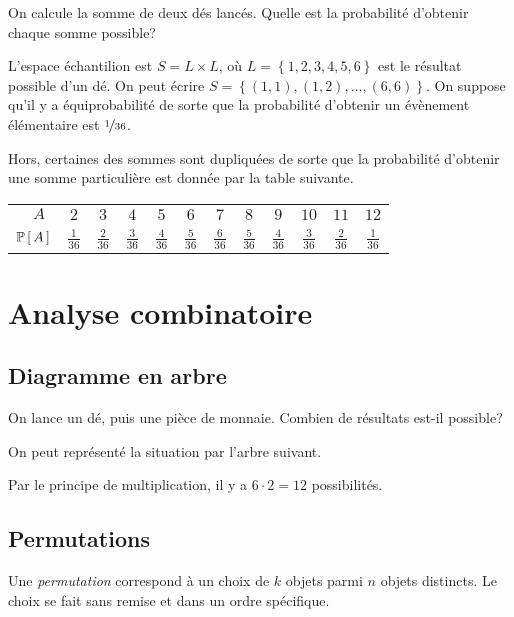 \documentclass[11pt]{article}
\renewcommand\P[1]{%
	\ensuremath{%
		\mathbb{P}\left[\,#1\,\right]%
	}%
}%
\begin{document}
\begin{exemple}
	On calcule la somme de deux dés lancés. Quelle est la probabilité d'obtenir
	chaque somme possible?
	
	L'espace échantilion est $S=L\times L$, où $L=\left\{1,2,3,4,5,6\right\}$
	est le résultat possible d'un dé. On peut écrire
	$S=\left\{(1,1),(1,2),\dots,(6,6)\right\}$. On suppose qu'il y a
	équiprobabilité de sorte que la probabilité d'obtenir un évènement
	élémentaire est $\nicefrac{1}{36}$.

	Hors, certaines des sommes sont dupliquées de sorte que la probabilité
	d'obtenir une somme particulière est donnée par la table suivante.
	\begin{table}[H]
		\centering
		\begin{tabular}{r|ccccccccccc}
			$\phantom{\mathbb{P}(}A\phantom{)}$ &
			$2$ & $3$ & $4$ & $5$ & $6$ & $7$ & $8$ & $9$ & $10$ & $11$ & $12$\\
			$\P{A}$ &
			$\frac{1}{36}$ & $\frac{2}{36}$ & $\frac{3}{36}$ & $\frac{4}{36}$ &
			$\frac{5}{36}$ & $\frac{6}{36}$ & $\frac{5}{36}$ & $\frac{4}{36}$ &
			$\frac{3}{36}$ & $\frac{2}{36}$ & $\frac{1}{36}$\\
		\end{tabular}
	\end{table}
\end{exemple}

\section{Analyse combinatoire}
\subsection{Diagramme en arbre}

\begin{exemple}
	On lance un dé, puis une pièce de monnaie. Combien de résultats est-il
	possible?
	
	On peut représenté la situation par l'arbre suivant.
	\begin{figure}[H]
		\centering
		
	\end{figure}
	Par le principe de multiplication, il y a $6\cdot 2=12$ possibilités.
\end{exemple}

\subsection{Permutations}
\begin{definition}
	Une \textit{permutation} correspond à un choix de $k$ objets parmi $n$
	objets distincts. Le choix se fait sans remise et dans un ordre spécifique.
\end{definition}
\end{document}
